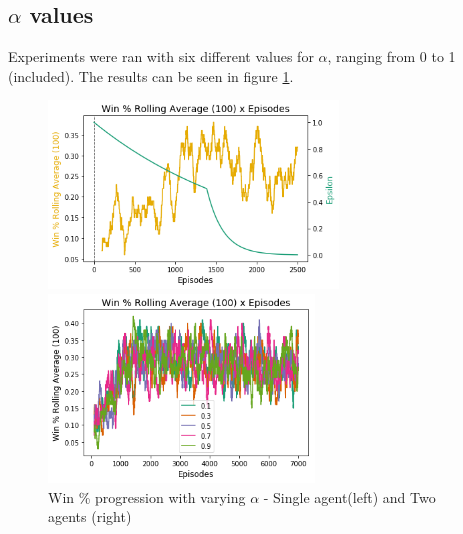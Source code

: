 \documentclass[10pt]{article}
\begin{document}
    \subsection{$\alpha$ values}
        Experiments were ran with six different values for $\alpha$, ranging from 0 to 1 (included). The results can be seen in figure \ref{fig:exp3}.
        \begin{figure}[h]
            \centering
            \begin{minipage}[b]{0.4\textwidth}
                \includegraphics[height=5cm]{Images/exp_3/1_win_percent.png}
            \end{minipage}
            \hfill
            \begin{minipage}[b]{0.4\textwidth}
                \includegraphics[height=5cm]{Images/exp_3/2_win_percent.png}
            \end{minipage}
            \caption{Win \% progression with varying $\alpha$ - Single agent(left) and Two agents (right)}
            \label{fig:exp3}
        \end{figure}
\end{document}
